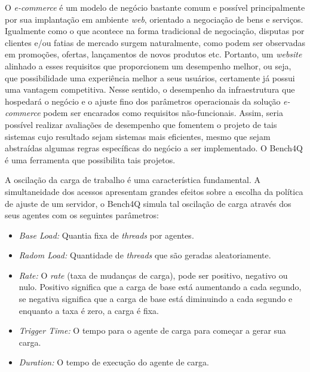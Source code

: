 O \textit{e-commerce} é um modelo de negócio bastante comum e possível principalmente por sua implantação em ambiente \textit{ web}, orientado a negociação de bens e serviços. Igualmente como o que acontece na forma tradicional de negociação, disputas por clientes e/ou fatias de mercado surgem naturalmente, como podem ser observadas em promoções, ofertas, lançamentos de novos produtos etc. Portanto, um \textit{ website} alinhado a esses requisitos que proporcionem um desempenho melhor, ou seja, que possibilidade uma experiência melhor a seus usuários, certamente já possui uma vantagem competitiva. Nesse sentido, o desempenho da infraestrutura que hospedará o negócio e o ajuste fino dos parâmetros operacionais da solução \textit{e-commerce} podem ser encarados como requisitos não-funcionais. Assim, seria possível realizar avaliações de desempenho que fomentem o projeto de tais sistemas cujo resultado sejam sistemas mais eficientes, mesmo que sejam abstraídas algumas regras específicas do negócio a ser implementado. O Bench4Q é uma ferramenta que possibilita tais projetos.

A oscilação da carga de trabalho é uma característica fundamental. A simultaneidade dos acessos apresentam grandes efeitos sobre a escolha da política de ajuste de um servidor, o Bench4Q simula tal oscilação de carga através dos seus agentes com os seguintes parâmetros:

\begin{itemize}
	\item \textit{Base Load:} Quantia fixa de \textit{threads} por agentes.
	\item \textit{Radom Load:} Quantidade de \textit{threads} que são geradas aleatoriamente.
	\item \textit{Rate:} O \textit{rate} (taxa de mudanças de carga), pode ser positivo, negativo ou nulo. Positivo significa que a carga de base está aumentando a cada segundo, se negativa significa que a carga de base está diminuindo a cada segundo e enquanto a taxa é zero, a carga é fixa.
	\item \textit{Trigger Time:} O tempo para o agente de carga para começar a gerar sua carga.
	\item \textit{Duration:} O tempo de execução do agente de carga.
\end{itemize}

